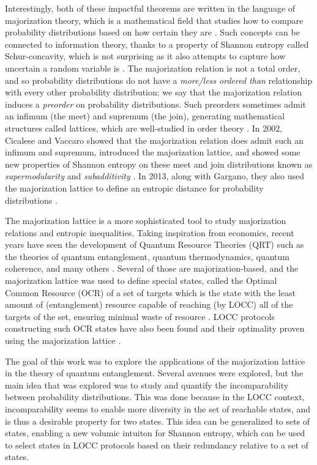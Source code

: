 Interestingly, both of these impactful theorems are written in the language of majorization theory, which is a mathematical field that studies how to compare probability distributions based on how certain they are \cite{marshall_inequalities_2011}. Such concepts can be connected to information theory, thanks to a property of Shannon entropy called Schur-concavity, which is not surprising as it also attempts to capture how uncertain a random variable is \cite{marshall_inequalities_2011, cover_elements_2006}. The majorization relation is not a total order, and so probability distributions do not have a \textit{more/less ordered than} relationship with every other probability distribution: we say that the majorization relation induces a \textit{preorder} on probability distributions. Such preorders sometimes admit an infimum (the meet) and supremum (the join), generating mathematical structures called lattices, which are well-studied in order theory \cite{davey_introduction_2002}. In 2002, Cicalese and Vaccaro showed that the majorization relation does admit such an infimum and supremum, introduced the majorization lattice, and showed some new properties of Shannon entropy on these meet and join distributions known as \textit{supermodularity} and \textit{subadditivity} \cite{cicalese_supermodularity_2002}. In 2013, along with Gargano, they also used the majorization lattice to define an entropic distance for probability distributions \cite{cicalese_information_2013}.

The majorization lattice is a more sophisticated tool to study majorization relations and entropic inequalities. Taking inspiration from economics, recent years have seen the development of Quantum Resource Theories (QRT) such as the theories of quantum entanglement, quantum thermodynamics, quantum coherence, and many others \cite{chitambar_quantum_2019}. Several of those are majorization-based, and the majorization lattice was used to define special states, called the Optimal Common Resource (OCR) of a set of targets which is the state with the least amount of (entanglement) resource capable of reaching (by LOCC) all of the targets of the set, ensuring minimal waste of resource \cite{bosyk_optimal_2019}. LOCC protocols constructing such OCR states have also been found and their optimality proven using the majorization lattice \cite{deside_probabilistic_2024}.

The goal of this work was to explore the applications of the majorization lattice in the theory of quantum entanglement. Several avenues were explored, but the main idea that was explored was to study and quantify the incomparability between probability distributions. This was done because in the LOCC context, incomparability seems to enable more diversity in the set of reachable states, and is thus a desirable property for two states. This idea can be generalized to sets of states, enabling a new volumic intuiton for Shannon entropy, which can be used to select states in LOCC protocols based on their redundancy relative to a set of states.

